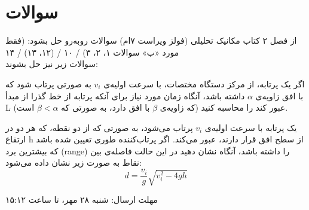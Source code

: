 \documentclass{article}
\begin{document}
\noindent
\section*{سوالات}
از فصل ۲ کتاب مکانیک تحلیلی (فولز ویراست ۷ام) سوالات روبه‌رو حل بشود:
(فقط مورد «ب» سوالات ۱، ۲، ۳) / ۱۰ / (۱۲، ۱۳) / ۱۴
\\

\noindent
{\large سوالات زیر نیز حل بشوند:}
    \begin{question}
        اگر یک پرتابه، از مرکز دستگاه مختصات، با سرعت اولیه‌ی $v_i$
        به صورتی پرتاب شود که با افق زاویه‌ی $\alpha$
        داشته باشد، آنگاه زمان مورد نیاز برای آنکه پرتابه از خط گذرا از مبدأ L
        (که زاویه‌ی $\beta$ با افق دارد، به صورتی که $\beta < \alpha$ است)
        عبور کند را محاسبه کنید.
    \end{question}

    \begin{question}
        یک پرتابه با سرعت اولیه‌ی $v_i$ پرتاب می‌شود،
        به صورتی که از دو نقطه، که هر دو در ارتفاع h از سطح افق قرار دارند،
        عبور می‌کند.
        اگر پرتاب‌کننده طوری تعیین شده باشد که بیشترین برد (range) را داشته باشد،
        آنگاه نشان دهید در این حالت فاصله‌ی بین نقاط به صورت زیر نشان داده می‌شود:
        $$
            d = \frac{v_i}{g}\sqrt{v_i^2 - 4gh}
        $$
    \end{question}

    \vspace{3cm}
    مهلت ارسال: شنبه ۲۸ مهر، تا ساعت ۱۵:۱۲
\end{document}
